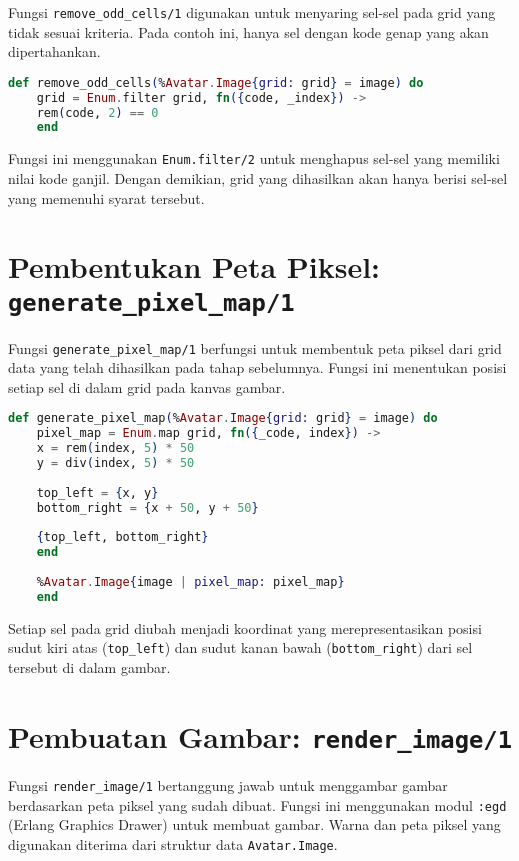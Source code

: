Fungsi \texttt{remove\_odd\_cells/1} digunakan untuk menyaring sel-sel pada grid yang tidak sesuai kriteria. Pada contoh ini, hanya sel dengan kode genap yang akan dipertahankan.

\begin{lstlisting}[language=elixir]
	def remove_odd_cells(%Avatar.Image{grid: grid} = image) do
	grid = Enum.filter grid, fn({code, _index}) ->
	rem(code, 2) == 0
	end
\end{lstlisting}

Fungsi ini menggunakan \texttt{Enum.filter/2} untuk menghapus sel-sel yang memiliki nilai kode ganjil. Dengan demikian, grid yang dihasilkan akan hanya berisi sel-sel yang memenuhi syarat tersebut.

\section{Pembentukan Peta Piksel: \texttt{generate\_pixel\_map/1}}

Fungsi \texttt{generate\_pixel\_map/1} berfungsi untuk membentuk peta piksel dari grid data yang telah dihasilkan pada tahap sebelumnya. Fungsi ini menentukan posisi setiap sel di dalam grid pada kanvas gambar.

\begin{lstlisting}[language=elixir]
	def generate_pixel_map(%Avatar.Image{grid: grid} = image) do
	pixel_map = Enum.map grid, fn({_code, index}) ->
	x = rem(index, 5) * 50
	y = div(index, 5) * 50
	
	top_left = {x, y}
	bottom_right = {x + 50, y + 50}
	
	{top_left, bottom_right}
	end
	
	%Avatar.Image{image | pixel_map: pixel_map}
	end
\end{lstlisting}

Setiap sel pada grid diubah menjadi koordinat yang merepresentasikan posisi sudut kiri atas (\texttt{top\_left}) dan sudut kanan bawah (\texttt{bottom\_right}) dari sel tersebut di dalam gambar.


\section{Pembuatan Gambar: \texttt{render\_image/1}}

Fungsi \texttt{render\_image/1} bertanggung jawab untuk menggambar gambar berdasarkan peta piksel yang sudah dibuat. Fungsi ini menggunakan modul \texttt{:egd} (Erlang Graphics Drawer) untuk membuat gambar. Warna dan peta piksel yang digunakan diterima dari struktur data \texttt{Avatar.Image}.


